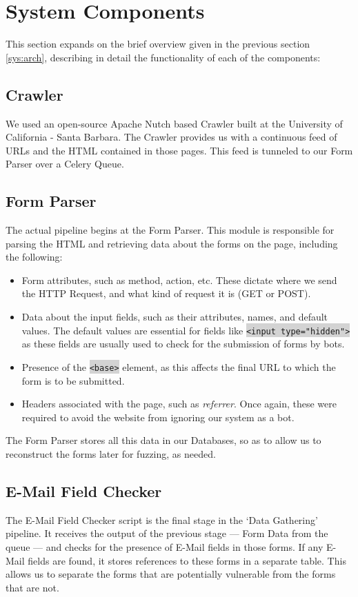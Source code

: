 \section{System Components}
\label{Comp}

This section expands on the brief overview given in the previous section \ref{sys:arch}, describing in detail the functionality of each of the components:

\subsection{Crawler}
\label{Comp:Crawler}
We used an open-source Apache Nutch based Crawler built at the University of California - Santa Barbara. The Crawler provides us with a continuous feed of URLs and the HTML contained in those pages. This feed is tunneled to our Form Parser over a Celery Queue.

\subsection{Form Parser}
\label{Comp:FP}
The actual pipeline begins at the Form Parser. This module is responsible for parsing the HTML and retrieving data about the forms on the page, including the following:
\begin{itemize}
	\item Form attributes, such as method, action, etc. These dictate where we send the HTTP Request, and what kind of request it is (GET or POST).
	\item Data about the input fields, such as their attributes, names, and default values. The default values are essential for fields like \colorbox{lightgray}{\lstinline{<input type="hidden">}} as these fields are usually used to check for the submission of forms by bots.
	\item Presence of the \colorbox{lightgray}{\lstinline{<base>}} element, as this affects the final URL to which the form is to be submitted.
	\item Headers associated with the page, such as \emph{referrer}. Once again, these were required to avoid the website from ignoring our system as a bot.
\end{itemize} 
The Form Parser stores all this data in our Databases, so as to allow us to reconstruct the forms later for fuzzing, as needed.

\subsection{E-Mail Field Checker}
\label{Comp:EMFC}
The E-Mail Field  Checker script is the final stage in the `Data Gathering' pipeline. It receives the output of the previous stage --- Form Data from the queue --- and checks for the presence of E-Mail fields in those forms. If any E-Mail fields are found, it stores references to these forms in a separate table. This allows us to separate the forms that are potentially vulnerable from the forms that are not.

